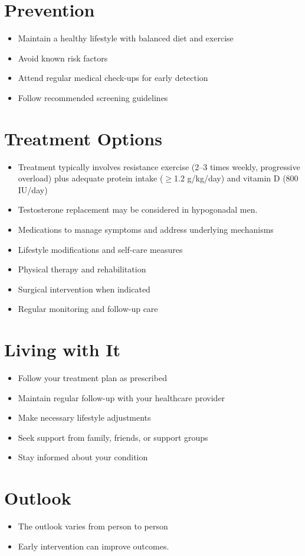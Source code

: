 \section{Prevention}
\begin{itemize}[noitemsep]
  \item Maintain a healthy lifestyle with balanced diet and exercise
  \item Avoid known risk factors
  \item Attend regular medical check-ups for early detection
  \item Follow recommended screening guidelines
\end{itemize}
\section{Treatment Options}
\begin{itemize}[noitemsep]
  \item Treatment typically involves resistance exercise (2--3 times weekly, progressive overload) plus adequate protein intake ($\ge$1.2 g/kg/day) and vitamin D (800 IU/day)
  \item Testosterone replacement may be considered in hypogonadal men.
  \item Medications to manage symptoms and address underlying mechanisms
  \item Lifestyle modifications and self-care measures
  \item Physical therapy and rehabilitation
  \item Surgical intervention when indicated
  \item Regular monitoring and follow-up care
\end{itemize}
\section{Living with It}
\begin{itemize}[noitemsep]
  \item Follow your treatment plan as prescribed
  \item Maintain regular follow-up with your healthcare provider
  \item Make necessary lifestyle adjustments
  \item Seek support from family, friends, or support groups
  \item Stay informed about your condition
\end{itemize}
\section{Outlook}
\begin{itemize}[noitemsep]
  \item The outlook varies from person to person
  \item Early intervention can improve outcomes.
\end{itemize}
